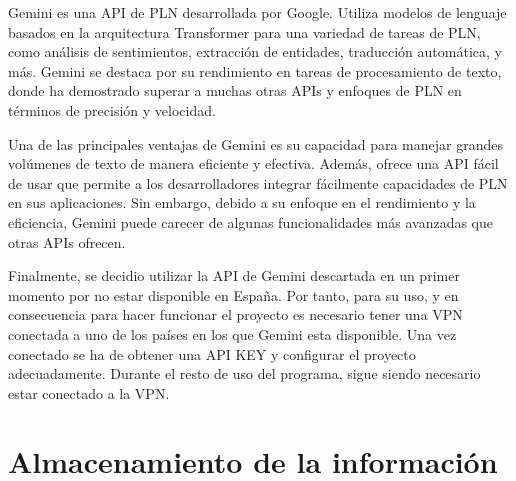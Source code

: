 Gemini es una API de PLN desarrollada por Google. Utiliza modelos de lenguaje basados en la arquitectura Transformer para una variedad de tareas de PLN, como análisis de sentimientos, extracción de entidades, traducción automática, y más. Gemini se destaca por su rendimiento en tareas de procesamiento de texto, donde ha demostrado superar a muchas otras APIs y enfoques de PLN en términos de precisión y velocidad.

Una de las principales ventajas de Gemini es su capacidad para manejar grandes volúmenes de texto de manera eficiente y efectiva. Además, ofrece una API fácil de usar que permite a los desarrolladores integrar fácilmente capacidades de PLN en sus aplicaciones. Sin embargo, debido a su enfoque en el rendimiento y la eficiencia, Gemini puede carecer de algunas funcionalidades más avanzadas que otras APIs ofrecen.

Finalmente, se decidio utilizar la API de Gemini descartada en un primer momento por no estar disponible en España. Por tanto, para su uso, y en consecuencia para hacer funcionar el proyecto es necesario tener una VPN conectada a uno de los países en los que Gemini esta disponible. Una vez conectado se ha de obtener una API KEY y configurar el proyecto adecuadamente. Durante el resto de uso del programa, sigue siendo necesario estar conectado a la VPN.







\section{Almacenamiento de la información}	
